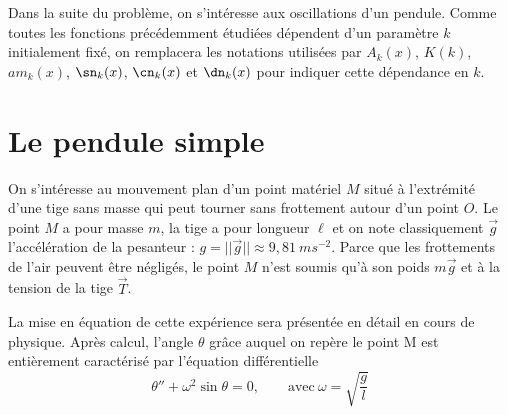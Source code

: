 \documentclass[a4paper,french,bookmarks]{article}
\begin{document}
Dans la suite du problème, on s’intéresse aux oscillations d’un pendule. Comme toutes les fonctions précédemment étudiées dépendent d’un paramètre $k$ initialement fixé, on remplacera les notations utilisées par $A_k(x)$, $K(k)$, $am_k(x)$, $\sn_k(x)$, $\cn_k(x)$ et $\dn_k(x)$ pour indiquer cette dépendance en $k$.

\section{Le pendule simple}

\begin{minipage}{.8\linewidth}
    On s’intéresse au mouvement plan d’un point matériel $M$ situé à l’extrémité d’une tige sans masse qui peut tourner sans frottement autour d’un point $O$. Le point $M$ a pour masse $m$, la tige a pour longueur $\ell$ et on note classiquement $\vec{g}$ l’accélération de la pesanteur : $g = ||\vec{g}|| \approx 9, 81 \ ms^{-2}$. Parce que les frottements de l’air peuvent être négligés, le point $M$ n’est soumis qu’à son poids $m\vec{g}$ et à la tension de la tige $\vec{T}$.\newline
    
    La mise en équation de cette expérience sera présentée en détail en cours de physique. Après calcul, l’angle $\theta$ grâce auquel on repère le point M est entièrement caractérisé par l’équation différentielle
    \[ \boxed{\theta'' + \omega^2\sin\theta=0, \qquad \text{avec} \ \omega = \sqrt{\dfrac{g}{l}}} \]
    \newline
\end{minipage}\hfill
\begin{minipage}{.15\linewidth}
\end{minipage}
\end{document}

